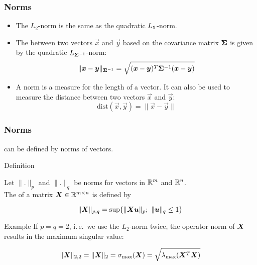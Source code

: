 \begin{frame}
  \frametitle{Norms \cont}


  \begin{itemize}
    \item The $L_2$-norm is the same as the quadratic $L_{{\bm 1}}$-norm. \\[.5cm] \pause
    \item The  between two vectors $\vec x$ and $\vec y$ based on the covariance matrix ${\bm \Sigma}$ is given by the quadratic $L_{{\bm \Sigma}^{-1}}$-norm:
      \begin{displaymath}
        \| {\bm x} - {\bm y}\|_{{\bm \Sigma}^{-1}} = 
        \sqrt{ ({\bm x} - {\bm y})^T {\bm \Sigma}^{-1} ({\bm x} - {\bm y})}
      \end{displaymath}
      \pause
    \item A norm is a measure for the length of a vector. It can also be used to measure the distance between two vectors $\vec x$ and $\vec y$:
      \begin{displaymath}
        \mbox{dist}(\vec x, \vec y) = \| \vec x - \vec y\|
      \end{displaymath}
  \end{itemize}
\end{frame}
 
 
\begin{frame}
  \frametitle{Norms \cont}

   can be defined by norms of vectors. \\[.25cm]
  
  \begin{citeblock}{Definition}

    \small
    Let $\|.\|_p$ and $\|.\|_q$ be norms for vectors in $\mathbb{R}^m$ and $\mathbb{R}^n$. \\
    The  of a matrix ${\bm X}\in \mathbb{R}^{m\times n}$  is defined by
 
    \begin{displaymath}
      \| {\bm X}\|_{p,q} = \sup\{ \| {\bm X} {\bm u}\|_p ; \  \| {\bm u}\|_q\leq 1 \}
    \end{displaymath}
  \end{citeblock}
  \pspread
  
  \begin{ovalblock}{Example}
    \small
    If $p=q=2$, i.\,e.\ we use the $L_2$-norm twice, the operator norm of ${\bm X}$ \\
    results in the maximum singular value:
    
    \begin{displaymath}
      \| {\bm X}\|_{2,2}=   \| {\bm X}\|_{2} = \sigma_{\max}{({\bm X})}= \sqrt{\lambda_{\max}({\bm X}^T{\bm X})}
    \end{displaymath}
  \end{ovalblock}
\end{frame}



